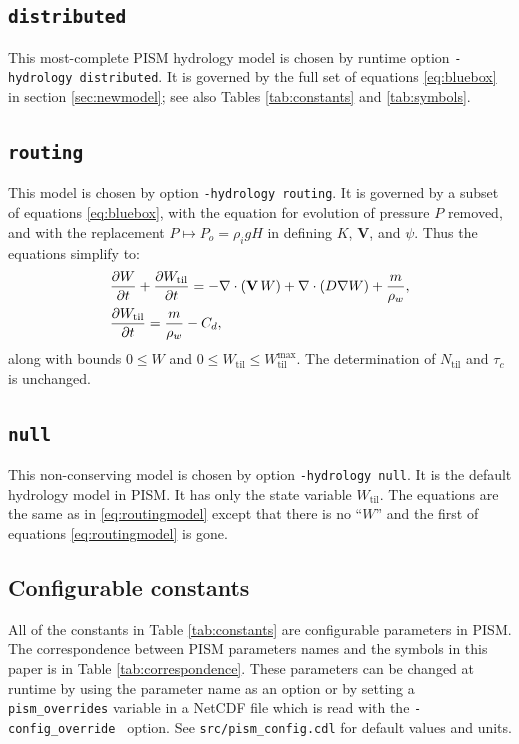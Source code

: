 \documentclass[gmd]{copernicus}   %
\newcommand{\text}{\textrm}
\newcommand\bV{\mathbf{V}}
\newcommand{\ddt}[1]{\ensuremath{\frac{\partial #1}{\partial t}}}
\newcommand{\Div}{\nabla\cdot}
\newcommand{\grad}{\nabla}
\newcommand{\Ntil}{N_{\text{til}}}
\newcommand{\Wtil}{W_{\text{til}}}
\newcommand{\Wtilmax}{W_{\text{til}}^{\text{max}}}
\begin{document}
\subsection{\texttt{distributed}}  This most-complete PISM hydrology model is chosen by runtime option \texttt{-hydrology distributed}.  It is governed by the full set of equations \eqref{eq:bluebox} in section \ref{sec:newmodel}; see also Tables \ref{tab:constants} and \ref{tab:symbols}.

\subsection{\texttt{routing}}  This model is chosen by option \texttt{-hydrology routing}.  It is governed by a subset of equations \eqref{eq:bluebox}, with the equation for evolution of pressure $P$ removed, and with the replacement $P\mapsto P_o = \rho_i g H$ in defining $K$, $\bV$, and $\psi$.  Thus the equations simplify to:
\begin{align}
&\ddt{W} + \ddt{\Wtil} = - \Div\left(\bV\, W\right) + \Div \left(D \grad W\right) + \frac{m}{\rho_w}, \label{eq:routingmodel} \\
&\frac{\partial \Wtil}{\partial t} = \frac{m}{\rho_w} - C_d, \notag
\end{align}
along with bounds $0\le W$ and $0\le \Wtil \le \Wtilmax$.  The determination of $\Ntil$ and $\tau_c$ is unchanged.

\subsection{\texttt{null}}  This non-conserving model is chosen by option \texttt{-hydrology null}.  It is the default hydrology model in PISM.  It has only the state variable $\Wtil$.  The equations are the same as in \eqref{eq:routingmodel} except that there is no ``$W$'' and the first of equations \eqref{eq:routingmodel} is gone.

\subsection{Configurable constants}  All of the constants in Table \ref{tab:constants} are configurable parameters in PISM.  The correspondence between PISM parameters names and the symbols in this paper is in Table \ref{tab:correspondence}.  These parameters can be changed at runtime by using the parameter name as an option or by setting a \verb|pism_overrides| variable in a NetCDF file which is read with the \verb|-config_override | option.  See \verb|src/pism_config.cdl| for default values and units.
\end{document}
